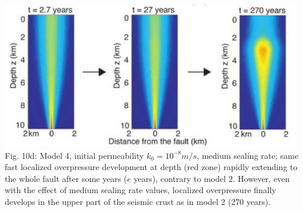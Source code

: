 \begin{center}
\includegraphics[width=13cm]{python_codes/fieldstone_126/images/grfr03_10d}\\
{\captionfont Fig. 10d:
Model 4, initial permeability $k_0 = 10^{-8} m/s$, 
medium sealing rate; same fast localized overpressure
development at depth (red zone) rapidly extending to the whole fault after some years 
($e$ years), contrary to model 2. However, even with the effect of medium sealing rate values, 
localized overpressure finally develops in the upper part of the seismic crust as in model 2 (270 years).
}
\end{center}




